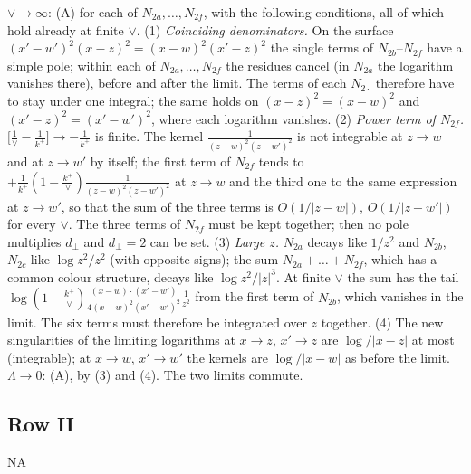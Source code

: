 \documentclass[9pt]{article}
\numberwithin{equation}{section}
\begin{document}
\par{}\par\medskip
\noindent $\vee\to\infty$: (A) for each of $N_{2a},\dots,N_{2f}$, with the following conditions, all of which hold already at finite $\vee$. (1) \emph{Coinciding denominators.} On the surface $(x'-w')^{2}(x-z)^{2}=(x-w)^{2}(x'-z)^{2}$ the single terms of $N_{2b}$--$N_{2f}$ have a simple pole; within each of $N_{2a},\dots,N_{2f}$ the residues cancel (in $N_{2a}$ the logarithm vanishes there), before and after the limit. The terms of each $N_{2\cdot}$ therefore have to stay under one integral; the same holds on $(x-z)^{2}=(x-w)^{2}$ and $(x'-z)^{2}=(x'-w')^{2}$, where each logarithm vanishes. (2) \emph{Power term of $N_{2f}$.} $\big[\frac{1}{\vee}-\frac{1}{k^{+}}\big]\to-\frac{1}{k^{+}}$ is finite. The kernel $\frac{1}{(z-w)^{2}(z-w')^{2}}$ is not integrable at $z\to w$ and at $z\to w'$ by itself; the first term of $N_{2f}$ tends to $+\frac{1}{k^{+}}(1-\frac{k^{+}}{\vee})\frac{1}{(z-w)^{2}(z-w')^{2}}$ at $z\to w$ and the third one to the same expression at $z\to w'$, so that the sum of the three terms is $O(1/|z-w|)$, $O(1/|z-w'|)$ for every $\vee$. The three terms of $N_{2f}$ must be kept together; then no pole multiplies $d_{\perp}$ and $d_{\perp}=2$ can be set. (3) \emph{Large $z$.} $N_{2a}$ decays like $1/z^{2}$ and $N_{2b}$, $N_{2c}$ like $\log z^{2}/z^{2}$ (with opposite signs); the sum $N_{2a}+\dots+N_{2f}$, which has a common colour structure, decays like $\log z^{2}/|z|^{3}$. At finite $\vee$ the sum has the tail $\log(1-\frac{k^{+}}{\vee})\frac{(x-w)\cdot(x'-w')}{4(x-w)^{2}(x'-w')^{2}}\frac{1}{z^{2}}$ from the first term of $N_{2b}$, which vanishes in the limit. The six terms must therefore be integrated over $z$ together. (4) The new singularities of the limiting logarithms at $x\to z$, $x'\to z$ are $\log/|x-z|$ at most (integrable); at $x\to w$, $x'\to w'$ the kernels are $\log/|x-w|$ as before the limit. $\Lambda\to0$: (A), by (3) and (4). The two limits commute.
\subsection{Row II}
\textsc{NA}
\end{document}
